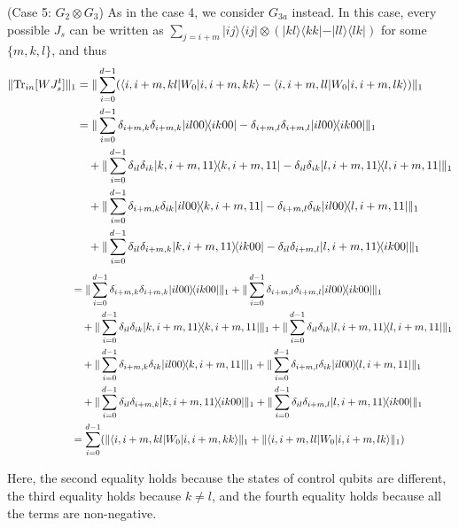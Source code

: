 \documentclass[a4paper,twocolumn,accepted=2022-10-23]{quantumarticle}
\newcommand{\bra}[1]{\langle {#1} \vert}
\newcommand{\ket}[1]{\vert {#1} \rangle}
\newcommand{\ketbra}[2]{\vert {#1} \rangle\!\langle {#2} \vert}
\newcommand{\Tr}[0]{{\mathrm{Tr}}}
\theoremstyle{definition}
\begin{document}
(Case 5: $G_2 \otimes G_3$) \quad
As in the case 4, we consider $G_{3a}$ instead.
In this case, every possible $J_s$ can be written as $\sum_{j=i+m} \ketbra{ij}{ij} \otimes (\ketbra{kl}{kk} - \ketbra{ll}{lk})$ for some $\{m,k,l\}$, and thus
\begin{align}
\| \Tr_{in} [W J_s^t] \|_1 &= \| \sum_{i=0}^{d-1} (\bra{i,i+m,kl} {W_0} \ket{i,i+m,kk} - \bra{i,i+m,ll} {W_0} \ket{i,i+m,lk})  \|_1 \\
&= \| \sum_{i=0}^{d-1}  \delta_{i+m,k}\delta_{i+m,k} \ketbra{il00}{ik00} - \delta_{i+m,l}\delta_{i+m,l} \ketbra{il00}{ik00} \|_1 \notag \\
&\quad + \| \sum_{i=0}^{d-1} \delta_{il}\delta_{ik} \ketbra{k,i+m,11}{k,i+m,11} - \delta_{il}\delta_{ik} \ketbra{l,i+m,11}{l,i+m,11} \|_1 \notag \\
&\quad + \| \sum_{i=0}^{d-1} \delta_{i+m,k}\delta_{ik} \ketbra{il00}{k,i+m,11} - \delta_{i+m,l}\delta_{ik} \ketbra{il00}{l,i+m,11} \|_1  \notag \\
&\quad + \| \sum_{i=0}^{d-1} \delta_{il}\delta_{i+m,k} \ketbra{k,i+m,11}{ik00} - \delta_{il}\delta_{i+m,l} \ketbra{l,i+m,11}{ik00} \|_1
\end{align}
\begin{align}
\phantom{\| \Tr_{in} [W J_s^t] \|_1} &= \| \sum_{i=0}^{d-1}  \delta_{i+m,k}\delta_{i+m,k} \ketbra{il00}{ik00} \|_1 + \| \sum_{i=0}^{d-1}\delta_{i+m,l}\delta_{i+m,l} \ketbra{il00}{ik00} \|_1 \notag \\
&\quad + \| \sum_{i=0}^{d-1} \delta_{il}\delta_{ik} \ketbra{k,i+m,11}{k,i+m,11} \|_1 + \| \sum_{i=0}^{d-1}\delta_{il}\delta_{ik} \ketbra{l,i+m,11}{l,i+m,11} \|_1 \notag \\
&\quad + \| \sum_{i=0}^{d-1} \delta_{i+m,k}\delta_{ik} \ketbra{il00}{k,i+m,11} \|_1 + \| \sum_{i=0}^{d-1}\delta_{i+m,l}\delta_{ik} \ketbra{il00}{l,i+m,11} \|_1  \notag \\
&\quad + \| \sum_{i=0}^{d-1} \delta_{il}\delta_{i+m,k} \ketbra{k,i+m,11}{ik00} \|_1 + \| \sum_{i=0}^{d-1}\delta_{il}\delta_{i+m,l} \ketbra{l,i+m,11}{ik00} \|_1 \\
&= \sum_{i=0}^{d-1} ( \|  \bra{i,i+m,kl} {W_0} \ket{i,i+m,kk}\|_1 + \| \bra{i,i+m,ll} {W_0} \ket{i,i+m,lk}  \|_1 )
\end{align}

Here, the second equality holds because the states of control qubits are different,
the third equality holds because $k \neq l$,
and the fourth equality holds because all the terms are non-negative.
\end{document}
